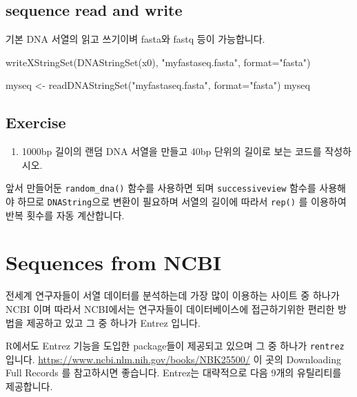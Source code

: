 \documentclass[
]{book}
\newenvironment{Shaded}{\begin{snugshade}}{\end{snugshade}}
\newcommand{\AttributeTok}[1]{\textcolor[rgb]{0.77,0.63,0.00}{#1}}
\newcommand{\FunctionTok}[1]{\textcolor[rgb]{0.00,0.00,0.00}{#1}}
\newcommand{\NormalTok}[1]{#1}
\newcommand{\OtherTok}[1]{\textcolor[rgb]{0.56,0.35,0.01}{#1}}
\newcommand{\StringTok}[1]{\textcolor[rgb]{0.31,0.60,0.02}{#1}}
\providecommand{\tightlist}{%
  \setlength{\itemsep}{0pt}\setlength{\parskip}{0pt}}
\begin{document}
\hypertarget{sequence-read-and-write}{%
\subsection{sequence read and write}\label{sequence-read-and-write}}

기본 DNA 서열의 읽고 쓰기이벼 fasta와 fastq 등이 가능합니다.

\begin{Shaded}
\begin{Highlighting}[]
\FunctionTok{writeXStringSet}\NormalTok{(}\FunctionTok{DNAStringSet}\NormalTok{(x0), }\StringTok{"myfastaseq.fasta"}\NormalTok{, }\AttributeTok{format=}\StringTok{"fasta"}\NormalTok{)}

\NormalTok{myseq }\OtherTok{\textless{}{-}} \FunctionTok{readDNAStringSet}\NormalTok{(}\StringTok{"myfastaseq.fasta"}\NormalTok{, }\AttributeTok{format=}\StringTok{"fasta"}\NormalTok{)}
\NormalTok{myseq}
\end{Highlighting}
\end{Shaded}

\hypertarget{exercise-6}{%
\subsection{Exercise}\label{exercise-6}}

\begin{enumerate}
\def\labelenumi{\arabic{enumi}.}
\tightlist
\item
  1000bp 길이의 랜덤 DNA 서열을 만들고 40bp 단위의 길이로 보는 코드를 작성하시오.
\end{enumerate}

앞서 만들어둔 \texttt{random\_dna()} 함수를 사용하면 되며 \texttt{successiveview} 함수를 사용해야 하므로 \texttt{DNAString}으로 변환이 필요하며 서열의 길이에 따라서 \texttt{rep()} 를 이용하여 반복 횟수를 자동 계산합니다.

\hypertarget{sequences-from-ncbi}{%
\section{Sequences from NCBI}\label{sequences-from-ncbi}}

전세계 연구자들이 서열 데이터를 분석하는데 가장 많이 이용하는 사이트 중 하나가 NCBI 이며 따라서 NCBI에서는 연구자들이 데이터베이스에 접근하기위한 편리한 방법을 제공하고 있고 그 중 하나가 Entrez 입니다.

R에서도 Entrez 기능을 도입한 package들이 제공되고 있으며 그 중 하나가 \texttt{rentrez} 입니다. \url{https://www.ncbi.nlm.nih.gov/books/NBK25500/} 이 곳의 Downloading Full Records 를 참고하시면 좋습니다. Entrez는 대략적으로 다음 9개의 유틸리티를 제공합니다.
\end{document}

